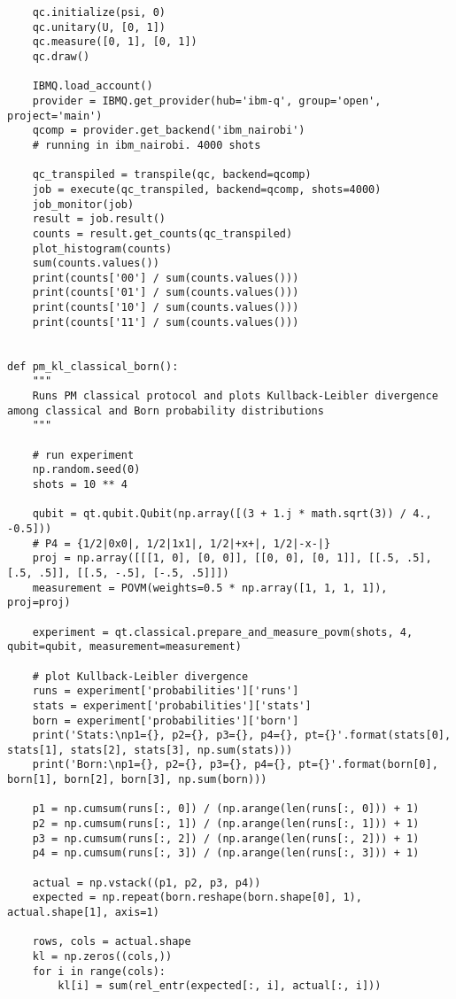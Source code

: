 \begin{verbatim}
    qc.initialize(psi, 0)
    qc.unitary(U, [0, 1])
    qc.measure([0, 1], [0, 1])
    qc.draw()

    IBMQ.load_account()
    provider = IBMQ.get_provider(hub='ibm-q', group='open', project='main')
    qcomp = provider.get_backend('ibm_nairobi')
    # running in ibm_nairobi. 4000 shots

    qc_transpiled = transpile(qc, backend=qcomp)
    job = execute(qc_transpiled, backend=qcomp, shots=4000)
    job_monitor(job)
    result = job.result()
    counts = result.get_counts(qc_transpiled)
    plot_histogram(counts)
    sum(counts.values())
    print(counts['00'] / sum(counts.values()))
    print(counts['01'] / sum(counts.values()))
    print(counts['10'] / sum(counts.values()))
    print(counts['11'] / sum(counts.values()))


def pm_kl_classical_born():
    """
    Runs PM classical protocol and plots Kullback-Leibler divergence among classical and Born probability distributions
    """

    # run experiment
    np.random.seed(0)
    shots = 10 ** 4

    qubit = qt.qubit.Qubit(np.array([(3 + 1.j * math.sqrt(3)) / 4., -0.5]))
    # P4 = {1/2|0x0|, 1/2|1x1|, 1/2|+x+|, 1/2|-x-|}
    proj = np.array([[[1, 0], [0, 0]], [[0, 0], [0, 1]], [[.5, .5], [.5, .5]], [[.5, -.5], [-.5, .5]]])
    measurement = POVM(weights=0.5 * np.array([1, 1, 1, 1]), proj=proj)

    experiment = qt.classical.prepare_and_measure_povm(shots, 4, qubit=qubit, measurement=measurement)

    # plot Kullback-Leibler divergence
    runs = experiment['probabilities']['runs']
    stats = experiment['probabilities']['stats']
    born = experiment['probabilities']['born']
    print('Stats:\np1={}, p2={}, p3={}, p4={}, pt={}'.format(stats[0], stats[1], stats[2], stats[3], np.sum(stats)))
    print('Born:\np1={}, p2={}, p3={}, p4={}, pt={}'.format(born[0], born[1], born[2], born[3], np.sum(born)))

    p1 = np.cumsum(runs[:, 0]) / (np.arange(len(runs[:, 0])) + 1)
    p2 = np.cumsum(runs[:, 1]) / (np.arange(len(runs[:, 1])) + 1)
    p3 = np.cumsum(runs[:, 2]) / (np.arange(len(runs[:, 2])) + 1)
    p4 = np.cumsum(runs[:, 3]) / (np.arange(len(runs[:, 3])) + 1)

    actual = np.vstack((p1, p2, p3, p4))
    expected = np.repeat(born.reshape(born.shape[0], 1), actual.shape[1], axis=1)

    rows, cols = actual.shape
    kl = np.zeros((cols,))
    for i in range(cols):
        kl[i] = sum(rel_entr(expected[:, i], actual[:, i]))


\end{verbatim}
